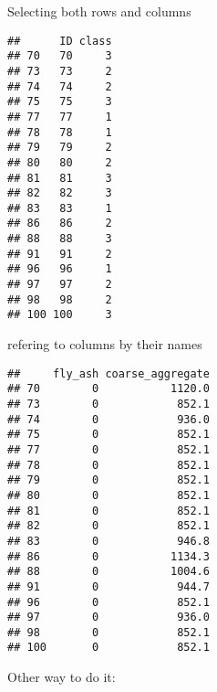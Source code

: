 \documentclass[]{article}
\newenvironment{Shaded}{\begin{snugshade}}{\end{snugshade}}
\newcommand{\DecValTok}[1]{\textcolor[rgb]{0.00,0.00,0.81}{#1}}
\newcommand{\KeywordTok}[1]{\textcolor[rgb]{0.13,0.29,0.53}{\textbf{#1}}}
\newcommand{\NormalTok}[1]{#1}
\newcommand{\OperatorTok}[1]{\textcolor[rgb]{0.81,0.36,0.00}{\textbf{#1}}}
\newcommand{\StringTok}[1]{\textcolor[rgb]{0.31,0.60,0.02}{#1}}
\begin{document}
Selecting both rows and columns

\begin{Shaded}
\end{Shaded}

\begin{verbatim}
##      ID class
## 70   70     3
## 73   73     2
## 74   74     2
## 75   75     3
## 77   77     1
## 78   78     1
## 79   79     2
## 80   80     2
## 81   81     3
## 82   82     3
## 83   83     1
## 86   86     2
## 88   88     3
## 91   91     2
## 96   96     1
## 97   97     2
## 98   98     2
## 100 100     3
\end{verbatim}

refering to columns by their names

\begin{Shaded}
\end{Shaded}

\begin{verbatim}
##     fly_ash coarse_aggregate
## 70        0           1120.0
## 73        0            852.1
## 74        0            936.0
## 75        0            852.1
## 77        0            852.1
## 78        0            852.1
## 79        0            852.1
## 80        0            852.1
## 81        0            852.1
## 82        0            852.1
## 83        0            946.8
## 86        0           1134.3
## 88        0           1004.6
## 91        0            944.7
## 96        0            852.1
## 97        0            936.0
## 98        0            852.1
## 100       0            852.1
\end{verbatim}

Other way to do it:

\begin{Shaded}
\end{Shaded}
\end{document}
